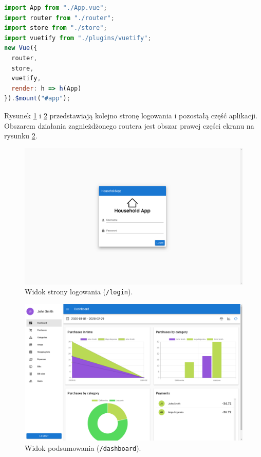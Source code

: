 \begin{lstlisting}[language=JavaScript, caption={Punkt wejścia skryptu inicjującego aplikację.}, label=lst:init]
import App from "./App.vue";
import router from "./router";
import store from "./store";
import vuetify from "./plugins/vuetify";
new Vue({
  router,
  store,
  vuetify,
  render: h => h(App)
}).$mount("#app");
\end{lstlisting}

Rysunek \ref{ss:login} i \ref{ss:dashboard} przedstawiają kolejno stronę logowania i pozostałą część aplikacji. Obszarem działania zagnieżdżonego routera jest obszar prawej części ekranu na rysunku \ref{ss:dashboard}.

\begin{figure}[H]
  \centering
  \includegraphics[width=0.95\linewidth]{screenshots/login}
  \caption{Widok strony logowania (\lstinline{/login}).}
  \label{ss:login}
\end{figure}
\begin{figure}[H]
  \centering
  \includegraphics[width=0.95\linewidth]{screenshots/dashboard}
  \caption{Widok podsumowania (\lstinline{/dashboard}).}
  \label{ss:dashboard}
\end{figure}

